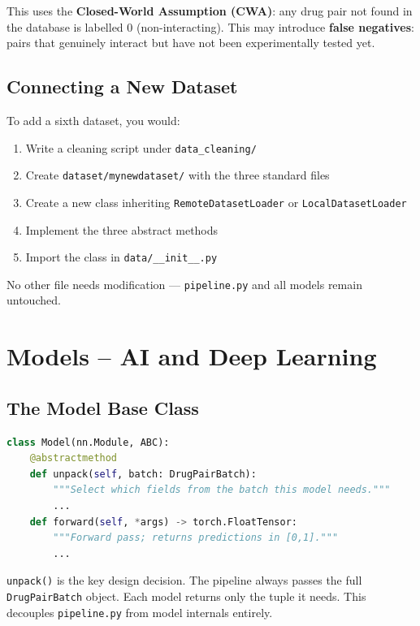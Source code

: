 \documentclass[12pt,a4paper,oneside]{book}
\begin{document}
\begin{tcolorbox}[warnbox]
This uses the \textbf{Closed-World Assumption (CWA)}: any drug pair not found in the database is labelled 0 (non-interacting). This may introduce \textbf{false negatives}: pairs that genuinely interact but have not been experimentally tested yet.
\end{tcolorbox}

\section{Connecting a New Dataset}

To add a sixth dataset, you would:
\begin{enumerate}
  \item Write a cleaning script under \texttt{data\_cleaning/}
  \item Create \texttt{dataset/mynewdataset/} with the three standard files
  \item Create a new class inheriting \texttt{RemoteDatasetLoader} or \texttt{LocalDatasetLoader}
  \item Implement the three abstract methods
  \item Import the class in \texttt{data/\_\_init\_\_.py}
\end{enumerate}
No other file needs modification --- \texttt{pipeline.py} and all models remain untouched.

\chapter{Models -- AI and Deep Learning}\label{chap:models}

\section{The Model Base Class}

\begin{lstlisting}[language=Python]
class Model(nn.Module, ABC):
    @abstractmethod
    def unpack(self, batch: DrugPairBatch):
        """Select which fields from the batch this model needs."""
        ...
    def forward(self, *args) -> torch.FloatTensor:
        """Forward pass; returns predictions in [0,1]."""
        ...
\end{lstlisting}

\texttt{unpack()} is the key design decision. The pipeline always passes the full \texttt{DrugPairBatch} object. Each model returns only the tuple it needs. This decouples \texttt{pipeline.py} from model internals entirely.
\end{document}
